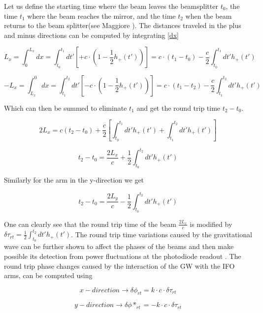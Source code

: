 Let us define the starting time where the beam leaves the beamsplitter $t_0$, the time $t_1$ where the beam reaches the mirror, and the time $t_2$ when the beam returns to the beam splitter(see Maggiore \cite[chapter 9]{Maggiore:2007ulw}). The distances traveled in the plus and minus directions can be computed by integrating \ref{dx}

\begin{equation}
L_{x}  = \int_0^{L_x} dx = \int_{t_0}^{t_1} dt' \left[+c \cdot\left(1-\frac{1}{2} h_+(t') \right)\right] = c\cdot(t_1-t_0) - \frac{c}{2} \int_{t_0}^{t_1} dt' h_+(t') 
\end{equation}

\begin{equation}
-L_{x}  = \int^0_{L_x} dx = \int_{t_1}^{t_2} dt' \left[-c \cdot\left(1-\frac{1}{2} h_+(t') \right)\right] = c\cdot(t_1-t_2) - \frac{c}{2} \int_{t_1}^{t_2} dt' h_+(t')
\end{equation}


Which can then be summed to eliminate $t_1$ and get the round trip time $t_2-t_0$.

\begin{equation}
2L_x = c(t_2 - t_0) + \frac{c}{2} \left[ \int_{t_0}^{t_1} dt' h_+(t') +  \int_{t_1}^{t_2} dt' h_+(t')\right]
\end{equation}

\begin{equation}
t_2 - t_0 = \frac{2L_x}{c} + \frac{1}{2} \int_{t_0}^{t_2} dt' h_+(t')
\end{equation}

Similarly for the arm in the y-direction we get

\begin{equation}
t_2 - t_0 = \frac{2L_y}{c} - \frac{1}{2} \int_{t_0}^{t_2} dt' h_+(t')
\end{equation}

One can clearly see that the round trip time of the beam $\frac{2L_x}{c}$ is modified by $\delta \tau_{rt} = \frac{1}{2} \int_{t_0}^{t_2} dt' h_+(t')$. The round trip time variations caused by the gravitational wave can be further shown to affect the phases of the beams and then make possible its detection from power fluctuations at the photodiode readout \cite{Saulson:1995zi}. The round trip phase changes caused by the interaction of the GW with the IFO arms, can be computed using 

\begin{equation}
x-direction \rightarrow \delta \phi_{rt} = k\cdot c \cdot \delta \tau_{rt}
\end{equation}

\begin{equation}
y-direction \rightarrow \delta \phi*_{rt} = - k\cdot c \cdot \delta \tau_{rt}
\end{equation}
